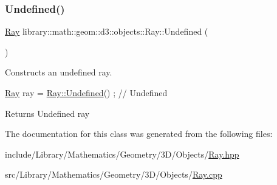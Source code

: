 \subsubsection{\texorpdfstring{Undefined()}{Undefined()}}
{\footnotesize\ttfamily \hyperlink{classlibrary_1_1math_1_1geom_1_1d3_1_1objects_1_1_ray}{Ray} library\+::math\+::geom\+::d3\+::objects\+::\+Ray\+::\+Undefined (\begin{DoxyParamCaption}{ }\end{DoxyParamCaption})\hspace{0.3cm}{\ttfamily [static]}}



Constructs an undefined ray. 


\begin{DoxyCode}
\hyperlink{classlibrary_1_1math_1_1geom_1_1d3_1_1objects_1_1_ray_a11b7613464daaebc6e25a758b057f203}{Ray} ray = \hyperlink{classlibrary_1_1math_1_1geom_1_1d3_1_1objects_1_1_ray_abf40bfaeab9e9024fd1fc73893da09e0}{Ray::Undefined}() ; \textcolor{comment}{// Undefined}
\end{DoxyCode}


\begin{DoxyReturn}{Returns}
Undefined ray 
\end{DoxyReturn}


The documentation for this class was generated from the following files\+:\begin{DoxyCompactItemize}
\item 
include/\+Library/\+Mathematics/\+Geometry/3\+D/\+Objects/\hyperlink{_ray_8hpp}{Ray.\+hpp}\item 
src/\+Library/\+Mathematics/\+Geometry/3\+D/\+Objects/\hyperlink{_ray_8cpp}{Ray.\+cpp}\end{DoxyCompactItemize}
